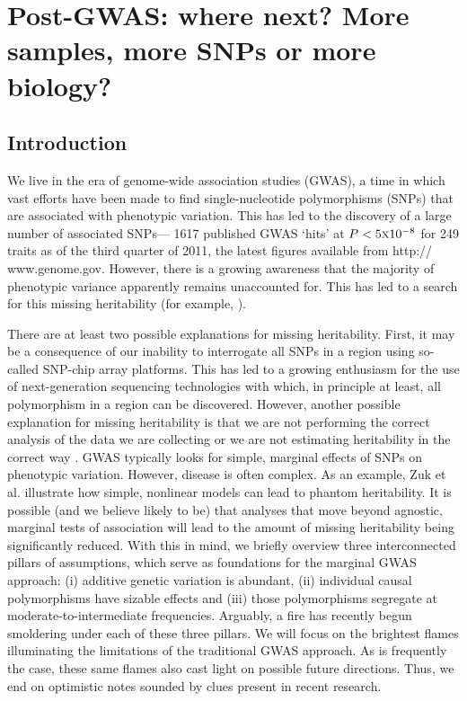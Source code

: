 \chapter{Post-GWAS: where next? More samples, more SNPs or more biology? \cite{marjoram14}}
\label{cha:research_topic_3}

\section{Introduction}
We live in the era of genome-wide association studies (GWAS), a time in which vast efforts have been made to find single-nucleotide polymorphisms (SNPs) that are associated with phenotypic variation. This has led to the discovery of a large number of associated SNPs— 1617 published GWAS `hits' at $P < 5 \textsc{x} 10^{-8}$ for 249 traits as of the third quarter of 2011, the latest figures available from http:// www.genome.gov. However, there is a growing awareness that the majority of phenotypic variance apparently remains unaccounted for. This has led to a search for this missing heritability (for example, \cite{Manolio2009, Eichler2010} ).

There are at least two possible explanations for missing heritability. First, it may be a consequence of our inability to interrogate all SNPs in a region using so-called SNP-chip array platforms. This has led to a growing enthusiasm for the use of next-generation sequencing technologies with which, in principle at least, all polymorphism in a region can be discovered. However, another possible explanation for missing heritability is that we are not performing the correct analysis of the data we are collecting or we are not estimating heritability in the correct way \cite{Zuk2012}. GWAS typically looks for simple, marginal effects of SNPs on phenotypic variation. However, disease is often complex. As an example, Zuk et al. \cite{Zuk2012} illustrate how simple, nonlinear models can lead to phantom heritability. It is possible (and we believe likely to be) that analyses that move beyond agnostic, marginal tests of association will lead to the amount of missing heritability being significantly reduced. With this in mind, we briefly overview three interconnected pillars of assumptions, which serve as foundations for the marginal GWAS approach: (i) additive genetic variation is abundant, (ii) individual causal polymorphisms have sizable effects and (iii) those polymorphisms segregate at moderate-to-intermediate frequencies. Arguably, a fire has recently begun smoldering under each of these three pillars. We will focus on the brightest flames illuminating the limitations of the traditional GWAS approach. As is frequently the case, these same flames also cast light on possible future directions. Thus, we end on optimistic notes sounded by clues present in recent research.

